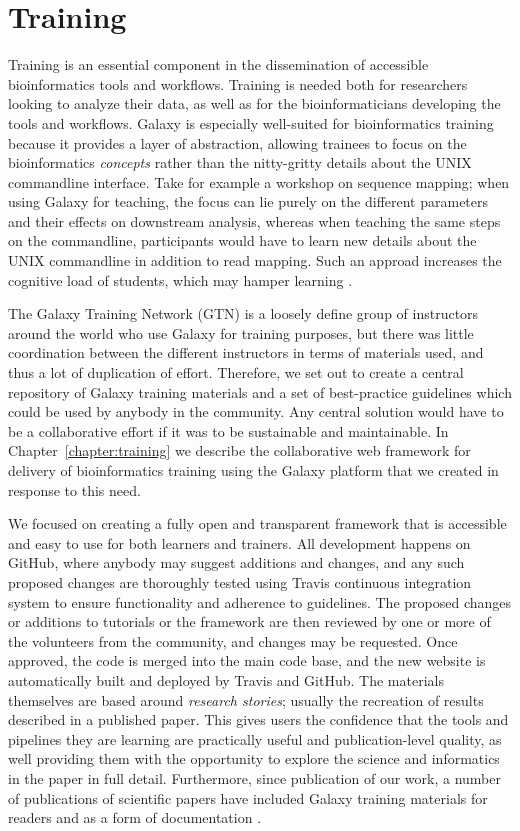 \section{Training}
Training is an essential component in the dissemination of accessible bioinformatics tools and workflows. Training is needed both for researchers looking to analyze their data, as well as for the bioinformaticians developing the tools and workflows. Galaxy is especially well-suited for bioinformatics training because it provides a layer of abstraction, allowing trainees to focus on the bioinformatics \emph{concepts} rather than the nitty-gritty details about the UNIX commandline interface. Take for example a workshop on sequence mapping; when using Galaxy for teaching, the focus can lie purely on the different parameters and their effects on downstream analysis, whereas when teaching the same steps on the commandline, participants would have to learn new details about the UNIX commandline in addition to read mapping. Such an approad increases the cognitive load of students, which may hamper learning \cite{paas2003cognitive}.

The Galaxy Training Network (GTN) is a loosely define group of instructors around the world who use Galaxy for training purposes, but there was little coordination between the different instructors in terms of materials used, and thus a lot of duplication of effort. Therefore, we set out to create a central repository of Galaxy training materials and a set of best-practice guidelines which could be used by anybody in the community. Any central solution would have to be a collaborative effort if it was to be sustainable and maintainable. In Chapter~\ref{chapter:training} we describe the collaborative web framework for delivery of bioinformatics training using the Galaxy platform that we created in response to this need.

We focused on creating a fully open and transparent framework that is accessible and easy to use for both learners and trainers. All development happens on GitHub, where anybody may suggest additions and changes, and any such proposed changes are thoroughly tested using Travis continuous integration system \cite{travis-ci} to ensure functionality and adherence to guidelines. The proposed changes or additions to tutorials or the framework are then reviewed by one or more of the volunteers from the community, and changes may be requested. Once approved, the code is merged into the main code base, and the new website is automatically built and deployed by Travis and GitHub. The materials themselves are based around \emph{research stories}; usually the recreation of results described in a published paper. This gives users the confidence that the tools and pipelines they are learning are practically useful and publication-level quality, as well providing them with the opportunity to explore the science and informatics in the paper in full detail. Furthermore, since publication of our work, a number of publications of scientific papers have included Galaxy training materials for readers and as a form of documentation \cite{TODO}.

